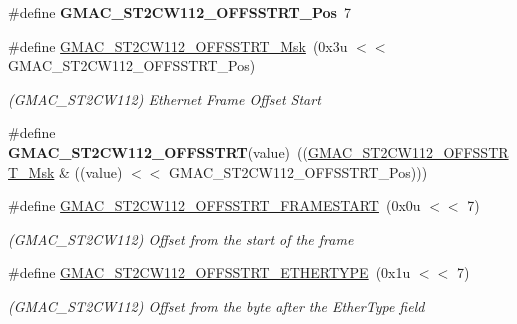 \begin{DoxyCompactItemize}
\item 
\mbox{\label{group__SAMV71__GMAC_ga200e36627f7e0273af825b2db8840cfa}} 
\#define {\bfseries G\+M\+A\+C\+\_\+\+S\+T2\+C\+W112\+\_\+\+O\+F\+F\+S\+S\+T\+R\+T\+\_\+\+Pos}~7
\item 
\mbox{\label{group__SAMV71__GMAC_ga8f0552054787f6a9bacefb4c1616c6c2}} 
\#define \mbox{\hyperlink{group__SAMV71__GMAC_ga8f0552054787f6a9bacefb4c1616c6c2}{G\+M\+A\+C\+\_\+\+S\+T2\+C\+W112\+\_\+\+O\+F\+F\+S\+S\+T\+R\+T\+\_\+\+Msk}}~(0x3u $<$$<$ G\+M\+A\+C\+\_\+\+S\+T2\+C\+W112\+\_\+\+O\+F\+F\+S\+S\+T\+R\+T\+\_\+\+Pos)
\begin{DoxyCompactList}\small\item\em (G\+M\+A\+C\+\_\+\+S\+T2\+C\+W112) Ethernet Frame Offset Start \end{DoxyCompactList}\item 
\mbox{\label{group__SAMV71__GMAC_ga58e7e69a105be78e0ce2ec76973cb951}} 
\#define {\bfseries G\+M\+A\+C\+\_\+\+S\+T2\+C\+W112\+\_\+\+O\+F\+F\+S\+S\+T\+RT}(value)~((\mbox{\hyperlink{group__SAMV71__GMAC_ga8f0552054787f6a9bacefb4c1616c6c2}{G\+M\+A\+C\+\_\+\+S\+T2\+C\+W112\+\_\+\+O\+F\+F\+S\+S\+T\+R\+T\+\_\+\+Msk}} \& ((value) $<$$<$ G\+M\+A\+C\+\_\+\+S\+T2\+C\+W112\+\_\+\+O\+F\+F\+S\+S\+T\+R\+T\+\_\+\+Pos)))
\item 
\mbox{\label{group__SAMV71__GMAC_gaea86e801d2bbddd64107ebbecb644b79}} 
\#define \mbox{\hyperlink{group__SAMV71__GMAC_gaea86e801d2bbddd64107ebbecb644b79}{G\+M\+A\+C\+\_\+\+S\+T2\+C\+W112\+\_\+\+O\+F\+F\+S\+S\+T\+R\+T\+\_\+\+F\+R\+A\+M\+E\+S\+T\+A\+RT}}~(0x0u $<$$<$ 7)
\begin{DoxyCompactList}\small\item\em (G\+M\+A\+C\+\_\+\+S\+T2\+C\+W112) Offset from the start of the frame \end{DoxyCompactList}\item 
\mbox{\label{group__SAMV71__GMAC_ga1d60d204a162ab3ca40db58f22e23c12}} 
\#define \mbox{\hyperlink{group__SAMV71__GMAC_ga1d60d204a162ab3ca40db58f22e23c12}{G\+M\+A\+C\+\_\+\+S\+T2\+C\+W112\+\_\+\+O\+F\+F\+S\+S\+T\+R\+T\+\_\+\+E\+T\+H\+E\+R\+T\+Y\+PE}}~(0x1u $<$$<$ 7)
\begin{DoxyCompactList}\small\item\em (G\+M\+A\+C\+\_\+\+S\+T2\+C\+W112) Offset from the byte after the Ether\+Type field \end{DoxyCompactList}\item 

\end{DoxyCompactItemize}
